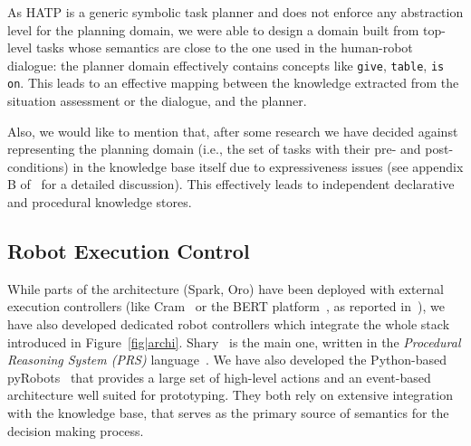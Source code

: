 \documentclass[preprint,3p,times]{elsarticle}
\newcommand{\ie}{i.e.\xspace}
\begin{document}
%
%
%

As HATP is a generic symbolic task planner and does not enforce any abstraction
level for the planning domain, we were able to design a domain built from
top-level tasks whose semantics are close to the one used in the human-robot
dialogue: the planner domain effectively contains concepts like \texttt{give},
\texttt{table}, \texttt{is on}. This leads to an effective mapping between the
knowledge extracted from the situation assessment or the dialogue, and the
planner.

Also, we would like to mention that, after some research we have decided against
representing the planning domain (\ie, the set of tasks with their pre- and
post-conditions) in the knowledge base itself due to expressiveness issues (see
appendix B of~\cite{Lemaignan2012a} for a detailed discussion). This effectively
leads to independent declarative and procedural knowledge stores.

\subsection{Robot Execution Control}
\label{sect|ctrl}

While parts of the architecture ({\sc Spark}, {\sc Oro}) have been deployed with
external execution controllers (like {\sc Cram}~\cite{Beetz2010} or the BERT
platform~\cite{Lallee2010b}, as reported in~\cite{Lemaignan2010}), we have also
developed dedicated robot controllers which integrate the whole stack introduced
in Figure~\ref{fig|archi}. {\sc Shary}~\cite{clodic2008shary} is the main one,
written in the \emph{Procedural Reasoning System (PRS)} language~\cite{Ingrand1996}.
We have also developed the Python-based {\sc pyRobots}~\cite{lemaignan2015pyrobots} that
provides a large set of high-level actions and an event-based architecture well
suited for prototyping. They both rely on extensive integration with the knowledge
base, that serves as the primary source of semantics for the decision making process.
\end{document}

